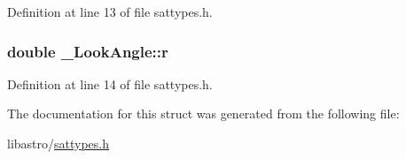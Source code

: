 Definition at line 13 of file sattypes.\-h.

\hypertarget{struct___look_angle_a44993855b66fea009b0a4ee09b72c4c4}{
\subsubsection[{r}]{\setlength{\rightskip}{0pt plus 5cm}double \-\_\-\-Look\-Angle\-::r}}\label{struct___look_angle_a44993855b66fea009b0a4ee09b72c4c4}


Definition at line 14 of file sattypes.\-h.



The documentation for this struct was generated from the following file\-:\begin{DoxyCompactItemize}
\item 
libastro/\hyperlink{sattypes_8h}{sattypes.\-h}\end{DoxyCompactItemize}
